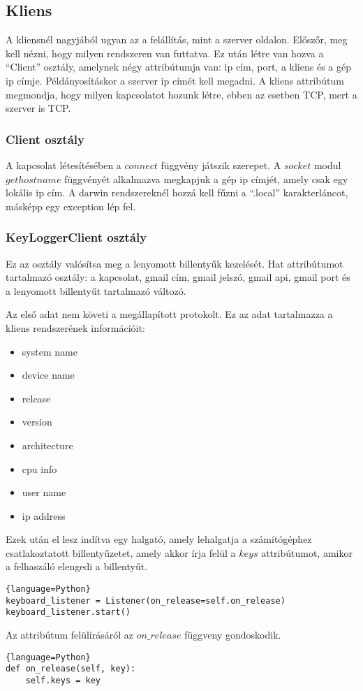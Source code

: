 \documentclass[a4paper, 11pt]{article}
\begin{document}
\subsection{Kliens}\label{subsec:client}
A kliensnél nagyjából ugyan az a felállítás, mint a szerver oldalon. Előszőr, meg kell nézni, hogy milyen rendszeren van futtatva. Ez után létre van hozva a ``Client'' osztály, amelynek négy attribútumja van: ip cím, port, a kliens és a gép ip címje. Példányosításkor a szerver ip címét kell megadni. A kliens attribútum megmondja, hogy milyen kapcsolatot hozunk létre, ebben az esetben TCP, mert a szerver is TCP.

\subsubsection{Client osztály}\label{subsubsec:clinetclass}

A kapcsolat létesítésében a $connect$ függvény játszik szerepet. A $socket$ modul $gethostname$ függvényét alkalmazva megkapjuk a gép ip címjét, amely csak egy lokális ip cím. A darwin rendszereknél hozzá kell fűzni a ``.local'' karakterláncot, másképp egy exception lép fel.


\subsubsection{KeyLoggerClient osztály}\label{subsubsec:keyloggerclientclass}
Ez az osztály valósítsa meg a lenyomott billentyűk kezelését. Hat attribútumot tartalmazó osztály: a kapcsolat, gmail cím, gmail jelszó, gmail api, gmail port és a lenyomott billentyűt tartalmazó változó.

Az első adat nem követi a megállapított protokolt. Ez az adat tartalmazza a kliens rendszerének információit:
\begin{itemize}
\item system name
\item device name
\item release
\item version
\item architecture
\item cpu info
\item user name
\item ip address
\end{itemize}
Ezek után el lesz indítva egy halgató, amely lehalgatja a számítógéphez csatlakoztatott billentyűzetet, amely akkor írja felül a $keys$ attribútumot, amikor a felhaszáló elengedi a billentyűt.
\begin{lstlisting}{language=Python}
keyboard_listener = Listener(on_release=self.on_release)
keyboard_listener.start()
\end{lstlisting}
Az attribútum felülírásáról az $on\_release$ függveny gondoskodik.
\begin{lstlisting}{language=Python}
def on_release(self, key):
	self.keys = key
\end{lstlisting}
\end{document}
